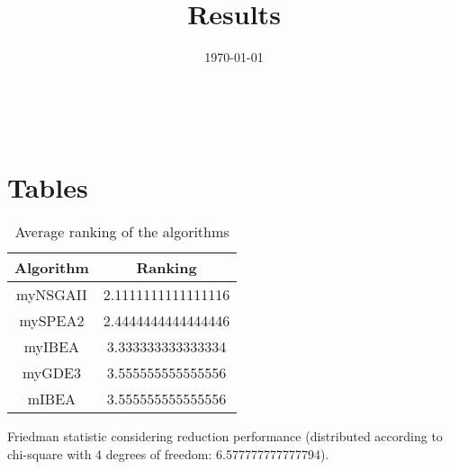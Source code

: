 \documentclass{article}
\title{Results}
\author{}
\date{\today}
\begin{document}
\oddsidemargin 0in \topmargin 0in\maketitle
\
\section{Tables}
\begin{table}[!htp]
\centering
\caption{Average ranking of the algorithms}
\begin{tabular}{c|c}
Algorithm&Ranking\\
\hline
myNSGAII&2.1111111111111116\\
mySPEA2&2.4444444444444446\\
myIBEA&3.333333333333334\\
myGDE3&3.555555555555556\\
mIBEA&3.555555555555556\\
\end{tabular}
\end{table}


Friedman statistic considering reduction performance (distributed according to chi-square with 4 degrees of freedom: 6.577777777777794).
\end{document}
